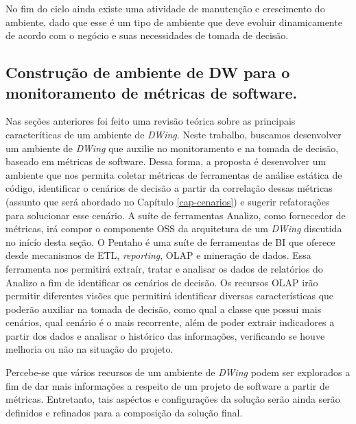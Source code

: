 No fim do ciclo ainda existe uma atividade de manutenção e crescimento do ambiente, dado que esse é um tipo de ambiente que deve evoluir dinamicamente de acordo com o negócio e suas necessidades de tomada de decisão.


\subsection{Construção de ambiente de DW para o monitoramento de métricas de software.}

%

Nas seções anteriores foi feito uma revisão teórica sobre as principais caracteríticas de um ambiente de \emph{DWing}. Neste trabalho, buscamos desenvolver um ambiente de \emph{DWing} que auxilie no monitoramento e na tomada de decisão, baseado em métricas de software. Dessa forma, a proposta é desenvolver um ambiente que nos permita coletar métricas de ferramentas de análise estática de código, identificar o cenários de decisão a partir da correlação dessas métricas (assunto que será abordado no Capítulo \ref{cap-cenarios}) e sugerir refatorações para solucionar esse cenário. A suíte de ferramentas Analizo, como fornecedor de métricas, irá compor o componente OSS da arquitetura de um \emph{DWing} discutida no inícío desta seção. O Pentaho é uma suíte de ferramentas de BI que oferece desde mecanismos de ETL, \emph{reporting}, OLAP e mineração de dados. Essa ferramenta nos permitirá extraír, tratar e analisar os dados de relatórios do Analizo a fim de identificar os cenários de decisão. Os recursos OLAP irão permitir diferentes visões que permitirá identificar diversas características que poderão auxiliar na tomada de decisão, como qual a classe que possui mais cenários, qual cenário é o mais recorrente, além de poder extrair indicadores a partir dos dados e analisar o histórico das informações, verificando se houve melhoria ou não na situação do projeto.

Percebe-se que vários recursos de um ambiente de \emph{DWing} podem ser explorados a fim de dar mais informações a respeito de um projeto de software a partir de métricas. Entretanto, tais aspéctos e configurações da solução serão ainda serão definidos e refinados para a composição da solução final.

%

